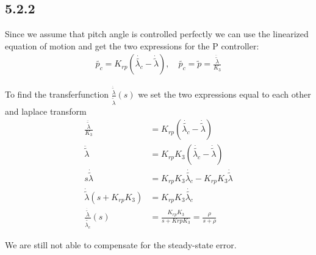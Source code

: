 \newpage
{}
\subsection*{5.2.2}
Since we assume that pitch angle is controlled perfectly we can use the linearized equation of motion and get the two expressions for the P controller:
\begin{align*}
    \tilde{p_c} = K_{rp}(\dot{\tilde{\lambda_c}} - \dot{\tilde{\lambda}}),\quad \tilde{p_c} = \tilde{p} = \frac{\ddot{\tilde{\lambda}}}{K_3}
\end{align*}

To find the transferfunction $\frac{\dot{\tilde{\lambda}}}{\dot{\tilde{\lambda}}}(s)$ we set the two expressions equal to each other and laplace transform  
\begin{align*}
    \frac{\ddot{\tilde{\lambda}}}{K_3}  &=  K_{rp}(\dot{\tilde{\lambda_c}}- \dot{\tilde{\lambda}})\\
    \ddot{\tilde{\lambda}}              &= K_{rp}K_3(\dot{\tilde{\lambda_c}}- \dot{\tilde{\lambda}})\\
    s\dot{\tilde{\lambda}}              &= K_{rp}K_3\dot{\tilde{\lambda_c}} - K_{rp}K_3\dot{\tilde{\lambda}}\\
    \dot{\tilde{\lambda}}(s + K_{rp}K_3) &= K_{rp}K_3\dot{\tilde{\lambda_c}}\\
    \frac{\dot{\tilde{\lambda}}}{\dot{\tilde{\lambda_c}}}(s) &= \frac{K_{rp}K_3}{s + K{rp}K_3} = \frac{\rho}{s + \rho}
\end{align*}

We are still not able to compensate for the steady-state error. 
